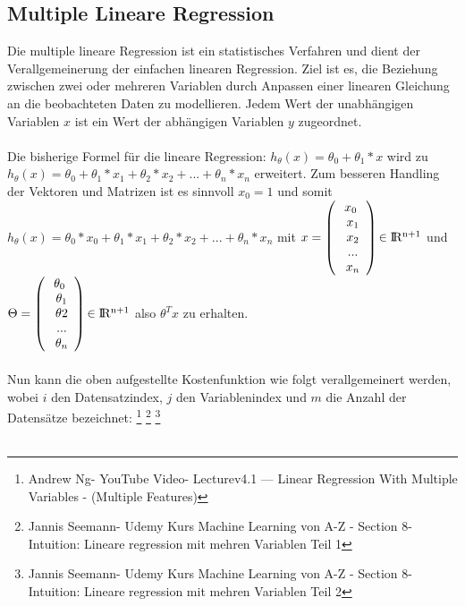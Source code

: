 \documentclass[a4paper]{scrreprt}
\begin{document}
\begin{enumerate}
\subsection{Multiple Lineare Regression}
Die multiple lineare Regression ist ein statistisches Verfahren und dient der Verallgemeinerung der einfachen linearen Regression. Ziel ist es, die Beziehung zwischen zwei oder mehreren Variablen durch Anpassen einer linearen Gleichung an die beobachteten Daten zu modellieren. Jedem Wert der unabhängigen Variablen ${x}$ ist ein Wert der abhängigen Variablen ${y}$ zugeordnet.\\\\
Die bisherige Formel für die lineare Regression: $h_{\theta}(x)=\theta_{0}+\theta_{1}*x$ wird zu $h_{\theta}(x)=\theta_{0}+\theta_{1}*x_{1}+\theta_{2}*x_{2}+...+\theta_{n}*x_{n}$ erweitert. Zum besseren Handling der Vektoren und Matrizen ist es sinnvoll $x_{0}=1$ und somit $h_{\theta}(x)=\theta_{0}*x_{0}+\theta_{1}*x_{1}+\theta_{2}*x_{2}+...+\theta_{n}*x_{n}$ mit
${x}=\left(\begin{array}{c} x_{0} \\\ x_{1} \\\ x_{2} \\\ ... \\\ x_{n}  \end{array}\right) {\in \rm I\!R^{n+1}}$ und  
${\Theta}=\left(\begin{array}{c}\theta_{0} \\\ \theta_{1} \\\ \theta{2} \\\ ... \\\ \theta_{n}  \end{array}\right) {\in \rm I\!R^{n+1}}$ also ${\theta^{T}x}$ zu erhalten.\\\\
Nun kann die oben aufgestellte Kostenfunktion wie folgt verallgemeinert werden, wobei ${i}$ den Datensatzindex, ${j}$ den Variablenindex und ${m}$ die Anzahl der Datensätze bezeichnet:
\footnote{Andrew Ng- YouTube Video- Lecturev4.1 — Linear Regression With Multiple Variables - (Multiple Features)}
\footnote{Jannis Seemann- Udemy Kurs Machine Learning von A-Z - Section 8- Intuition: Lineare regression mit mehren Variablen Teil 1}
\footnote{Jannis Seemann- Udemy Kurs Machine Learning von A-Z - Section 8- Intuition: Lineare regression mit mehren Variablen Teil 2}
\\\\

\end{enumerate}
\end{document}

